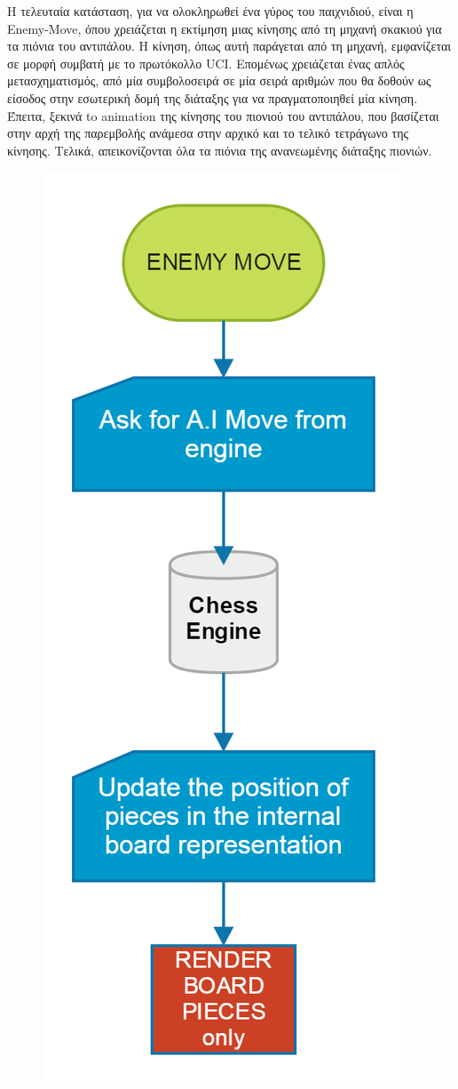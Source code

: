 Η τελευταία κατάσταση, για να ολοκληρωθεί ένα γύρος του παιχνιδιού, είναι η Enemy-Move, όπου χρειάζεται η εκτίμηση μιας κίνησης από τη μηχανή σκακιού για τα πιόνια του αντιπάλου. Η κίνηση, όπως αυτή παράγεται από τη μηχανή, εμφανίζεται σε μορφή συμβατή με το πρωτόκολλο UCI. Επομένως χρειάζεται ένας απλός μετασχηματισμός, από μία συμβολοσειρά σε μία σειρά αριθμών που θα δοθούν ως είσοδος στην εσωτερική δομή της διάταξης για να πραγματοποιηθεί μία κίνηση.
Έπειτα, ξεκινά to animation της κίνησης του πιονιού του αντιπάλου, που βασίζεται στην αρχή της παρεμβολής ανάμεσα στην αρχικό και το τελικό τετράγωνο της κίνησης. Τελικά, απεικονίζονται όλα τα πιόνια της ανανεωμένης διάταξης πιονιών.


\begin{figure}[H]
    \centering
    \includegraphics[scale=0.3]{Files/Figures/enemy_move.png}

\end{figure}
